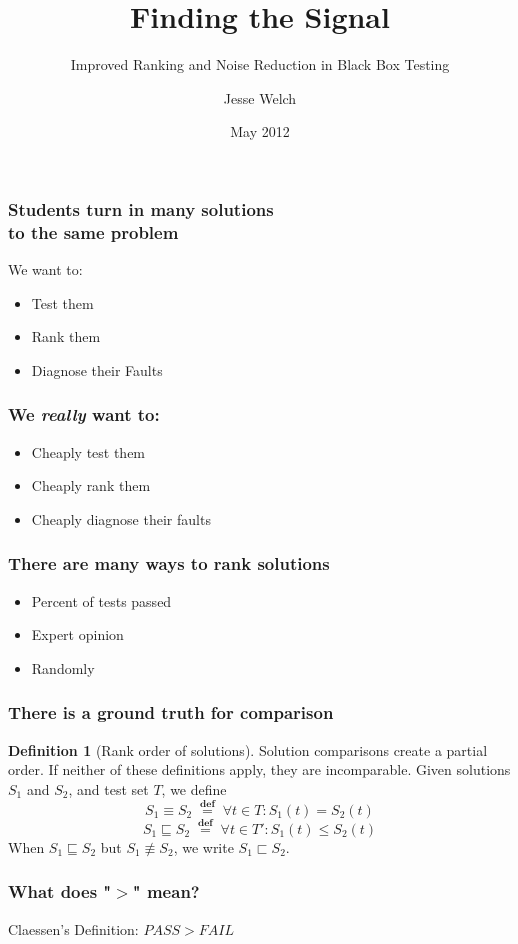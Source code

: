 \documentclass[svgnames]{beamer}
\title{Finding the Signal}
\subtitle{Improved Ranking and Noise Reduction in Black Box Testing}
\author{Jesse Welch}
\date{May 2012}
\newcommand\fail{\mathit{FAIL}}
\newcommand\pass{\mathit{PASS}}
\newcommand\defined{\mathrel{\;\stackrel{\scriptscriptstyle\mathbf{def}}{=}\;}}
\theoremstyle{definition}
\newtheorem{defn}{Definition}
\begin{document}
\begin{frame}
\maketitle
\end{frame}

\begin{frame}
\frametitle{Students turn in many solutions \\ to the same problem}
We want to:
\begin{itemize}
\item Test them
\item Rank them
\item Diagnose their Faults
\end{itemize}
\end{frame}

\begin{frame}
\frametitle{We \emph{really} want to:}
\begin{itemize}
\item Cheaply test them
\item Cheaply rank them
\item Cheaply diagnose their faults
\end{itemize}
\end{frame}

\begin{frame}
\frametitle{There are many ways to rank solutions}
\begin{itemize}
\item Percent of tests passed
\item Expert opinion
\item Randomly
\end{itemize}
\end{frame}

\begin{frame}
\frametitle{There is a ground truth for comparison}
\begin{defn}[Rank order of solutions]
Solution comparisons create a partial order. If neither of these definitions apply, they are incomparable.
Given solutions $S_1$ and $S_2$, and test set $T$, we define
$$S_1 \equiv S_2 \defined \forall t \in T : S_1(t) = S_2(t)$$
$$S_1 \sqsubseteq S_2 \defined \forall t \in T' : S_1(t) \leq S_2(t)$$
When $S_1 \sqsubseteq S_2$ but $S_1 \not\equiv S_2$, we write
$S_1 \sqsubset S_2$.
\end{defn}
\end{frame}

\begin{frame}
\frametitle{What does "$>$" mean?}
Claessen's Definition: $\pass>\fail$
\end{frame}
\end{document}
